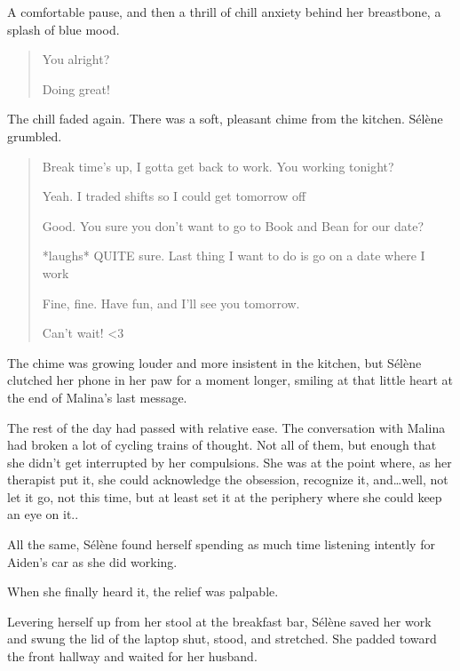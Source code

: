 A comfortable pause, and then a thrill of chill anxiety behind her breastbone, a splash of blue mood.

\begin{quote}
 You alright?

 Doing great!
\end{quote}

The chill faded again. There was a soft, pleasant chime from the kitchen. Sélène grumbled.

\begin{quote}
 Break time's up, I gotta get back to work. You working tonight?

 Yeah. I traded shifts so I could get tomorrow off

 Good. You sure you don't want to go to Book and Bean for our date?

 *laughs* QUITE sure. Last thing I want to do is go on a date where I work

 Fine, fine. Have fun, and I'll see you tomorrow.

 Can't wait! \textless{}3
\end{quote}

The chime was growing louder and more insistent in the kitchen, but Sélène clutched her phone in her paw for a moment longer, smiling at that little heart at the end of Malina's last message.

\secdiv{}

\noindent The rest of the day had passed with relative ease. The conversation with Malina had broken a lot of cycling trains of thought. Not all of them, but enough that she didn't get interrupted by her compulsions. She was at the point where, as her therapist put it, she could acknowledge the obsession, recognize it, and\ldots{}well, not let it go, not this time, but at least set it at the periphery where she could keep an eye on it..

All the same, Sélène found herself spending as much time listening intently for Aiden's car as she did working.

When she finally heard it, the relief was palpable.

Levering herself up from her stool at the breakfast bar, Sélène saved her work and swung the lid of the laptop shut, stood, and stretched. She padded toward the front hallway and waited for her husband.

